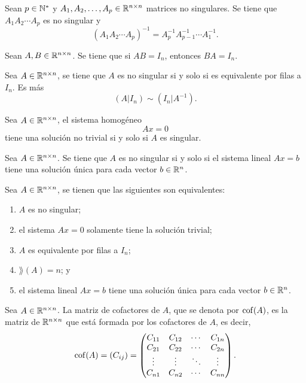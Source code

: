 \documentclass[a4,11pt]{aleph-notas}
\begin{document}
\begin{teo}
    Sean $p\in\N^*$ y $A_1, A_2, \ldots, A_p \in \Mat[\R]{n}{n}$ matrices no singulares. Se tiene que $A_1 A_2 \cdots A_p$ es no singular y 
    \[
        (A_1 A_2 \cdots A_p)^{-1} = A_p^{-1} A_{p-1}^{-1} \cdots A_1^{-1}.
    \]
\end{teo}

\begin{teo}
    Sean $A, B \in \Mat[\R]{n}{n}$. Se tiene que si $AB=I_n$, entonces $BA=I_n$.
\end{teo}

\begin{teo}
    Sea $A \in \Mat[\R]{n}{n}$, se tiene que $A$ es no singular si y solo si es equivalente por filas a $I_n$. Es más
    \[
        (A|I_n) \sim (I_n|A^{-1}).
    \]
\end{teo}

\begin{teo}
    Sea $A \in \Mat[\R]{n}{n}$, el sistema homogéneo 
    \[
        Ax = 0
    \]
    tiene una solución no trivial si y solo si $A$ es singular. 
\end{teo}

\begin{teo}
    Sea $A \in \Mat[\R]{n}{n}$. Se tiene que $A$ es no singular si y solo si el sistema lineal $Ax=b$ tiene una solución única para cada vector $b \in \R^{n}$.
\end{teo}

\begin{teo}
    Sea $A \in \Mat[\R]{n}{n}$, se tienen que las siguientes son equivalentes:
    \begin{enumerate}
    \item 
        $A$ es no singular;
    \item 
        el sistema $Ax=0$ solamente tiene la solución trivial;
    \item 
        $A$ es equivalente por filas a $I_n$;
    \item 
        $\rang(A)=n$; y 
    \item 
        el sistema lineal $Ax=b$ tiene una solución única para cada vector $b \in \R^{n}$. 
    \end{enumerate}
\end{teo}


\begin{defi}
    Sea $A \in \Mat[\R]{n}{n}$. La matriz de cofactores de $A$, que se denota por $\cof(A)$, es la matriz de $\Mat[\R]{n}{n}$ que está formada por los cofactores de $A$, es decir, 
    \[
        \cof(A) = (C_{ij}) = 
        \begin{pmatrix}
          C_{11} & C_{12} & \cdots & C_{1n} \\
          C_{21} & C_{22} & \cdots & C_{2n} \\
          \vdots & \vdots & \ddots &\vdots  \\
          C_{n1} & C_{n2} & \cdots & C_{nn}
        \end{pmatrix}.
    \]
\end{defi}
\end{document}
